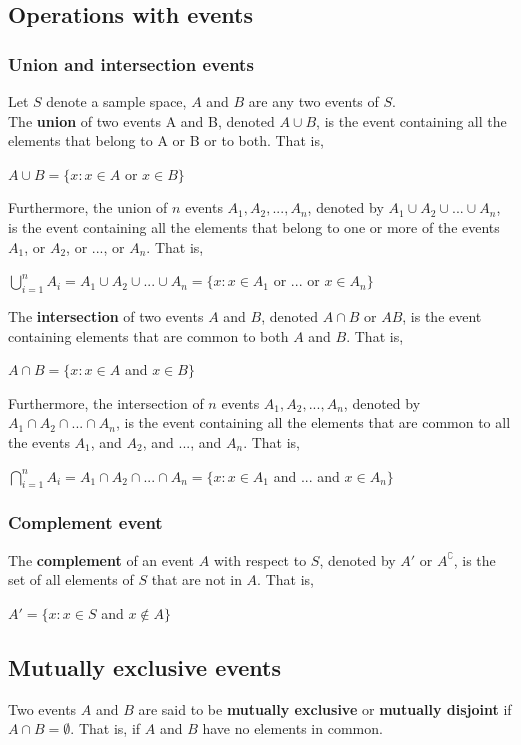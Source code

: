\documentclass[a4paper]{article}
\begin{document}
\subsection{Operations with events}
\subsubsection{Union and intersection events}
Let $S$ denote a sample space, $A$ and $B$ are any two events of $S$.\\
The \textbf{union} of two events A and B, denoted $A \cup B$, is the event containing all the elements that belong to A or B or to both. That is,
\begin{center}
	$A \cup B = \{x: x \in A$ or $x \in B\}$
\end{center}
Furthermore, the union of $n$ events $A_1, A_2, ..., A_n$, denoted by $A_1 \cup A_2 \cup ... \cup A_n$, is the event containing all the elements that belong to one or more of the events $A_1$, or $A_2$, or ..., or $A_n$. That is,
\begin{center}
	$\bigcup\limits_{i=1}^{n} A_i = A_1 \cup A_2 \cup ... \cup A_n = \{x:x\in A_1$ or $...$ or $x\in A_n\}$
\end{center}
The \textbf{intersection} of two events $A$ and $B$, denoted $A \cap B$ or $AB$, is the event containing elements that are common to both $A$ and $B$. That is,
\begin{center}
	$A \cap B = \{x:x \in A $ and $x \in B\}$
\end{center}
Furthermore, the intersection of $n$ events $A_1, A_2, ..., A_n$, denoted by $A_1 \cap A_2 \cap ... \cap A_n$, is the event containing all the elements that are common to all the events $A_1$, and $A_2$, and ..., and $A_n$. That is,
\begin{center}
	$\bigcap\limits_{i=1}^{n} A_i = A_1 \cap A_2 \cap ... \cap A_n = \{x:x\in A_1$ and $...$ and $x\in A_n\}$
\end{center}
\subsubsection{Complement event}
The \textbf{complement} of an event $A$ with respect to $S$, denoted by $A'$ or $A^\complement$, is the set of all elements of $S$ that are not in $A$. That is,
\begin{center}
	$A' = \{x:x\in S$ and $x \notin A\}$
\end{center}
\subsection{Mutually exclusive events}
Two events $A$ and $B$ are said to be \textbf{mutually exclusive} or \textbf{mutually disjoint} if $A\cap B = \emptyset$. That is, if $A$ and $B$ have no elements in common.
\end{document}
